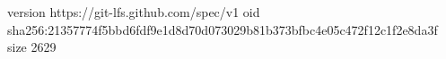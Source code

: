 version https://git-lfs.github.com/spec/v1
oid sha256:21357774f5bbd6fdf9e1d8d70d073029b81b373bfbc4e05c472f12c1f2e8da3f
size 2629
